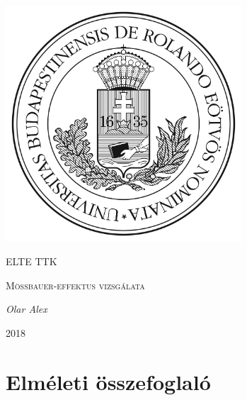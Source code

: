 \documentclass[a4paper,12pt]{article}
\begin{document}
\linespread{1.2}

\begin{titlepage}

	\centering
	\includegraphics[width=0.66\textwidth]{elte.jpg}\par\vspace{1cm}
	{\scshape\LARGE ELTE TTK \par}
	\vspace{3cm}
	{\scshape\Large Mössbauer-effektus vizsgálata\par}
	\vspace{1cm}
	{\large\itshape Olar Alex\par}
	\vspace{3cm}
	{\large 2018 \par}
	
\end{titlepage}

\begin{abstract}
\par A mérés célja az volt, hogy megismerkedjünk a legpontosabb energia mérési módszerrel a magfizikában, azaz a Mössbauer-effektussal. Ennek során különböző minták energiaátmeneteit vizsgáltuk, elektromos és mágneses térben.
\end{abstract}

\vfill

\tableofcontents

\newpage

\section{Elméleti összefoglaló}
\end{document}
